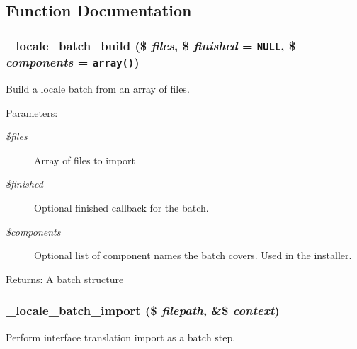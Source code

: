 \subsection{Function Documentation}
\hypertarget{group__locale_g4f10893e8ed214fe4739b9415a06948a}{
\subsubsection[{\_\-locale\_\-batch\_\-build}]{\setlength{\rightskip}{0pt plus 5cm}\_\-locale\_\-batch\_\-build (\$ {\em files}, \/  \$ {\em finished} = {\tt NULL}, \/  \$ {\em components} = {\tt array()})}}
\label{group__locale_g4f10893e8ed214fe4739b9415a06948a}


Build a locale batch from an array of files.

\begin{Desc}
\item[Parameters:]
\begin{description}
\item[{\em \$files}]Array of files to import \item[{\em \$finished}]Optional finished callback for the batch. \item[{\em \$components}]Optional list of component names the batch covers. Used in the installer. \end{description}
\end{Desc}
\begin{Desc}
\item[Returns:]A batch structure \end{Desc}
\hypertarget{group__locale_g97c8b79262e3aa8af4e5ea3b7908b99b}{
\subsubsection[{\_\-locale\_\-batch\_\-import}]{\setlength{\rightskip}{0pt plus 5cm}\_\-locale\_\-batch\_\-import (\$ {\em filepath}, \/  \&\$ {\em context})}}
\label{group__locale_g97c8b79262e3aa8af4e5ea3b7908b99b}


Perform interface translation import as a batch step.

